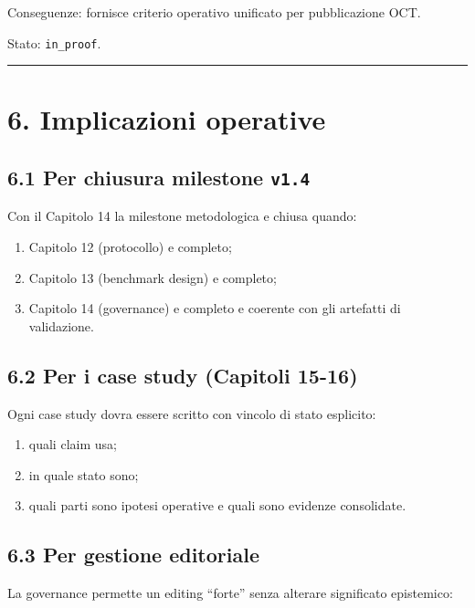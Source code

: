 Conseguenze:
fornisce criterio operativo unificato per pubblicazione OCT.

Stato: \texttt{in\_proof}.

\begin{center}\rule{0.5\linewidth}{0.5pt}\end{center}

\section{6. Implicazioni operative}

\subsection{\texorpdfstring{6.1 Per chiusura milestone \texttt{v1.4}}{6.1 Per chiusura milestone v1.4}}

Con il Capitolo 14 la milestone metodologica e chiusa quando:

\begin{enumerate}
\def\labelenumi{\arabic{enumi}.}
\tightlist
\item
  Capitolo 12 (protocollo) e completo;
\item
  Capitolo 13 (benchmark design) e completo;
\item
  Capitolo 14 (governance) e completo e coerente con gli artefatti di validazione.
\end{enumerate}

\subsection{6.2 Per i case study (Capitoli 15-16)}

Ogni case study dovra essere scritto con vincolo di stato esplicito:

\begin{enumerate}
\def\labelenumi{\arabic{enumi}.}
\tightlist
\item
  quali claim usa;
\item
  in quale stato sono;
\item
  quali parti sono ipotesi operative e quali sono evidenze consolidate.
\end{enumerate}

\subsection{6.3 Per gestione editoriale}

La governance permette un editing ``forte'' senza alterare significato epistemico:

